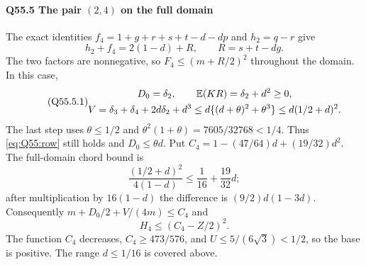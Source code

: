 \paragraph{Q55.5 The pair $(2,\allowbreak 4)$ on the full domain}\label{part:Q55.5}
The exact identities $f_4=\allowbreak 1+g+r+s+t-d-dp$ and $h_2=\allowbreak q-r$ give
\[
 h_2+f_4=2(1-d)+R,\qquad R=s+t-dg.
\]
The two factors are nonnegative, so $F_4\le\allowbreak (m+R/2)^2$ throughout the domain.
In this case,
\begin{equation}\tag{Q55.5.1}\label{eq:Q55:four-data}
 \begin{gathered}
 D_0=\delta_2,\qquad \mathbb E(KR)=\delta_2+d^2\ge0,\\
 V=\delta_3+\delta_4+2d\delta_2+d^3
 \le d\{(d+\theta)^2+\theta^3\}\le d(1/2+d)^2.
 \end{gathered}
\end{equation}
The last step uses $\theta\le\allowbreak 1/2$ and
$\theta^2(1+\theta)=\allowbreak 7605/32768<\allowbreak 1/4$.
Thus \eqref{eq:Q55:row} still holds and $D_0\le\allowbreak \theta d$.
Put $C_4=\allowbreak 1-(47/64)d+(19/32)d^2$. The full-domain chord bound is
\begin{equation}\tag{Q55.5.3}\label{eq:Q55:four-chord}
 \frac{(1/2+d)^2}{4(1-d)}\le\frac1{16}+\frac{19}{32}d;
\end{equation}
after multiplication by $16(1-d)$ the difference is $(9/2)d(1-3d)$.
Consequently $m+D_0/2+V/(4m)\le\allowbreak  C_4$ and
\begin{equation}\tag{Q55.5.4}\label{eq:Q55:four-majorant}
 H_4\le(C_4-Z/2)^2.
\end{equation}
The function $C_4$ decreases, $C_4\ge\allowbreak 473/576$, and
$U\le\allowbreak 5/(6\sqrt3)<\allowbreak 1/2$, so the base is positive.
The range $d\le\allowbreak 1/16$ is covered above.

